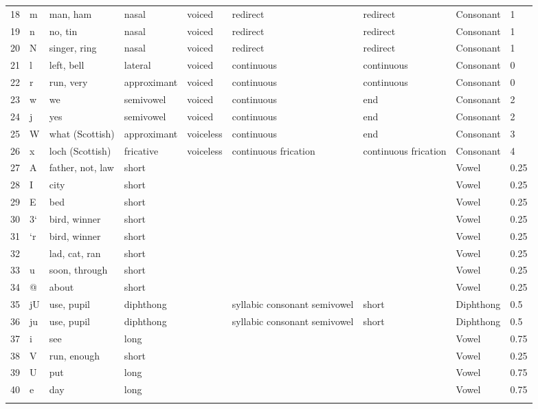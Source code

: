 \begin {longtable}{ llll llll l}
\rowcolor [gray]{.7}18&m&man, ham&nasal&voiced&redirect&redirect&Consonant&1
\\ 
\rowcolor [gray]{.8}19&n&no, tin&nasal&voiced&redirect&redirect&Consonant&1
\\ 
\rowcolor [gray]{.7}20&N&singer, ring&nasal&voiced&redirect&redirect&Consonant&1
\\ 
\rowcolor [gray]{.8}21&l&left, bell&lateral&voiced&continuous&continuous&Consonant&0
\\ 
\rowcolor [gray]{.7}22&r&run, very&approximant&voiced&continuous&continuous&Consonant&0
\\ 
\rowcolor [gray]{.8}23&w&we&semivowel&voiced&continuous&end&Consonant&2
\\ 
\rowcolor [gray]{.7}24&j&yes&semivowel&voiced&continuous&end&Consonant&2
\\ 
\rowcolor [gray]{.8}25&W&what (Scottish)&approximant&voiceless&continuous&end&Consonant&3
\\ 
\rowcolor [gray]{.7}26&x&loch (Scottish)&fricative&voiceless&continuous frication&continuous frication&Consonant&4
\\ 
\rowcolor [gray]{.8}27&A&father, not, law&short&&&&Vowel&0.25
\\ 
\rowcolor [gray]{.7}28&I&city&short&&&&Vowel&0.25
\\ 
\rowcolor [gray]{.8}29&E&bed&short&&&&Vowel&0.25
\\ 
\rowcolor [gray]{.7}30&3`&bird, winner&short&&&&Vowel&0.25
\\ 
\rowcolor [gray]{.8}31&`r&bird, winner&short&&&&Vowel&0.25
\\ 
\rowcolor [gray]{.7}32&{&lad, cat, ran&short&&&&Vowel&0.25
\\ 
\rowcolor [gray]{.8}33&u&soon, through&short&&&&Vowel&0.25
\\ 
\rowcolor [gray]{.7}34&@&about&short&&&&Vowel&0.25
\\ 
\rowcolor [gray]{.8}35&jU&use, pupil&diphthong&&syllabic consonant semivowel&short&Diphthong&0.5
\\ 
\rowcolor [gray]{.7}36&ju&use, pupil&diphthong&&syllabic consonant semivowel&short&Diphthong&0.5
\\ 
\rowcolor [gray]{.8}37&i&see&long&&&&Vowel&0.75
\\ 
\rowcolor [gray]{.7}38&V&run, enough&short&&&&Vowel&0.25
\\ 
\rowcolor [gray]{.8}39&U&put&long&&&&Vowel&0.75
\\ 
\rowcolor [gray]{.7}40&e&day&long&&&&Vowel&0.75
\\ 
}
\end{longtable}
